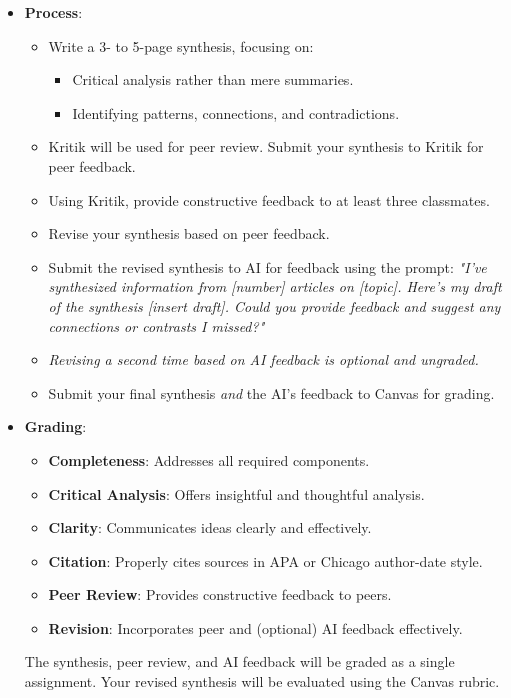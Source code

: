 \documentclass[12pt, letterpaper]{article}
\newenvironment{boldnumlist}
{\begin{enumerate}[label=\textbf{\arabic*.}]}
{\end{enumerate}}
\begin{document}
\begin{boldnumlist}
\begin{itemize}
    \item \textbf{Process}:
    \begin{itemize}
        \item Write a 3- to 5-page synthesis, focusing on:
        \begin{itemize}
            \item Critical analysis rather than mere summaries.
            \item Identifying patterns, connections, and contradictions.
        \end{itemize}
        \item Kritik will be used for peer review. Submit your synthesis to Kritik for peer feedback.
        \item Using Kritik, provide constructive feedback to at least three classmates.
        \item Revise your synthesis based on peer feedback.
        \item Submit the revised synthesis to AI for feedback using the prompt:
        \textit{"I've synthesized information from [number] articles on [topic]. Here's my draft of the synthesis [insert draft]. Could you provide feedback and suggest any connections or contrasts I missed?"}
        \item \emph{Revising a second time based on AI feedback is optional and ungraded.}
        \item Submit your final synthesis \emph{and} the AI's feedback to Canvas for grading.
    \end{itemize}
    \item \textbf{Grading}:
    \begin{itemize}
        \item \textbf{Completeness}: Addresses all required components.
        \item \textbf{Critical Analysis}: Offers insightful and thoughtful analysis.
        \item \textbf{Clarity}: Communicates ideas clearly and effectively.
        \item \textbf{Citation}: Properly cites sources in APA or Chicago author-date style.
        \item \textbf{Peer Review}: Provides constructive feedback to peers.
        \item \textbf{Revision}: Incorporates peer and (optional) AI feedback effectively.
    \end{itemize}
    The synthesis, peer review, and AI feedback will be graded as a single assignment. Your revised synthesis will be evaluated using the Canvas rubric.
\end{itemize}


\end{boldnumlist}
\end{document}
